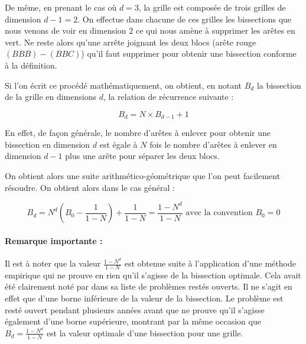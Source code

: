 De même, en prenant le cas où $d=3$, la grille est composée de trois grilles de dimension $d-1=2$. On effectue dans chacune de ces grilles les bissections que nous venons de voir en dimension $2$ ce qui nous amène à supprimer les arêtes en vert. Ne reste alors qu'une arrête joignant les deux blocs (arête rouge $(BBB)-(BBC)$) qu'il faut supprimer pour obtenir une bissection conforme à la définition.

Si l'on écrit ce procédé mathématiquement, on obtient, en notant $B_d$ la bissection de la grille en dimensions $d$, la relation de récurrence suivante :

$$B_d = N \times B_{d-1} + 1$$

En effet, de façon générale, le nombre d'arêtes à enlever pour obtenir une bissection en dimension $d$ est égale à $N$ fois le nombre d'arêtes à enlever en dimension $d-1$ plus une arête pour séparer les deux blocs.

On obtient alors une suite arithmético-géométrique que l'on peut facilement résoudre. On obtient alors dans le cas général :

$$B_d = N^d(B_0-\frac{1}{1-N}) + \frac{1}{1-N} = \frac{1-N^d}{1-N} \text{ avec la convention }B_0 = 0$$

\paragraph{Remarque importante :} Il est à noter que la valeur $\frac{1-N^d}{1-N}$ est obtenue suite à l'application d'une méthode empirique qui ne prouve en rien qu'il s'agisse de la bissection optimale. Cela avait été clairement noté par \cite{Leighton1992} dans sa liste de problèmes restés ouverts. Il ne s'agit en effet que d'une borne inférieure de la valeur de la bissection. Le problème est resté ouvert pendant plusieurs années avant que \cite{KE2007} ne prouve qu'il s'agisse également d'une borne supérieure, montrant par la même occasion que $B_d = \frac{1-N^d}{1-N}$ est la valeur optimale d'une bissection pour une grille.